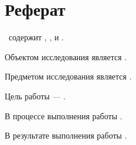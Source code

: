 \chapter*{Реферат}

\noindent
\thesisType\ содержит
,
,
и
.

\vspace{\baselineskip}

\noindent\abstractKeywords

\vspace{\baselineskip}

\noindent Объектом исследования является \researchObject.

\noindent Предметом исследования является \researchSubject.

\noindent Цель работы --- \researchPurpose.

\noindent В процессе выполнения работы \workDoneDescription.

\noindent В результате выполнения работы \workResultDescription.
